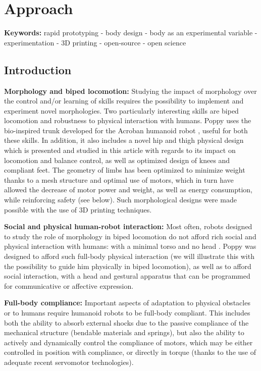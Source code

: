 
\chapter{Approach}

\textbf{Keywords:} rapid prototyping - body design - body as an experimental variable - experimentation - 3D printing - open-source - open science

\section{Introduction} %
\textbf{Morphology and biped locomotion:} Studying the impact of morphology over the control and/or learning of skills requires the possibility to implement and experiment novel morphologies.
Two particularly interesting skills are biped locomotion and robustness to physical interaction with humans.
Poppy uses the bio-inspired trunk developed for the Acroban humanoid robot \cite{Ly2011bio}, useful for both these skills.
In addition, it also includes a novel hip and thigh physical design which is presented and studied in this article with regards to its impact on locomotion and balance control, as well as optimized design of knees and compliant feet.
The geometry of limbs has been optimized to minimize weight thanks to a mesh structure and optimal use of motors, which in turn have allowed the decrease of motor power and weight, as well as energy consumption, while reinforcing safety (see below).
Such morphological designs were made possible with the use of 3D printing techniques.

\textbf{Social and physical human-robot interaction:} Most often, robots designed to study the role of morphology in biped locomotion do not afford rich social and physical interaction with humans: with a minimal torso and no head \cite{collins2001three}\cite{niiyama2010athlete}.
Poppy was designed to afford such full-body physical interaction (we will illustrate this with the possibility to guide him physically in biped locomotion), as well as to afford social interaction, with a head and gestural apparatus that can be programmed for communicative or affective expression.

\textbf{Full-body compliance:} Important aspects of adaptation to physical obstacles or to humans require humanoid robots to be full-body compliant.
This includes both the ability to absorb external shocks due to the passive compliance of the mechanical structure (bendable materials and springs), but also the ability to actively and dynamically control the compliance of motors, which may be either controlled in position with compliance, or directly in torque (thanks to the use of adequate recent servomotor technologies).


